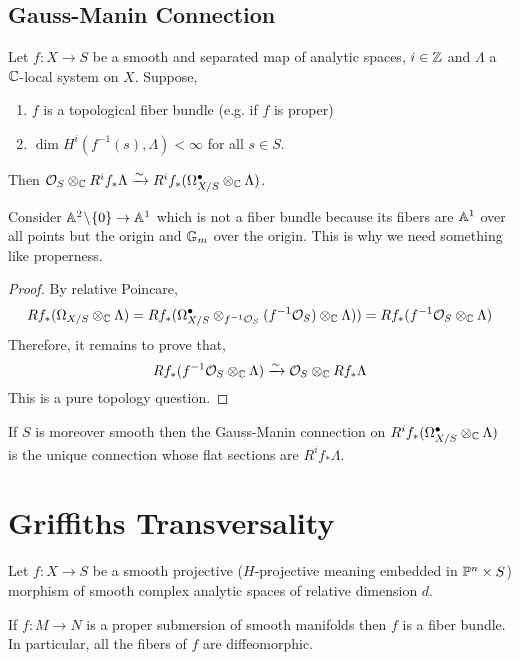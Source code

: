\documentclass[12pt]{article}
\begin{document}
\subsection{Gauss-Manin Connection}

\begin{prop}
Let $f : X \to S$ be a smooth and separated map of analytic spaces, $i \in \Z$ and $\Lambda$ a $\CC$-local system on $X$. Suppose,
\begin{enumerate}
\item $f$ is a topological fiber bundle (e.g. if $f$ is proper) 
\item $\dim{H^i(f^{-1}(s), \Lambda)} < \infty$ for all $s \in S$.
\end{enumerate}
Then $\struct{S} \ot_{\CC} R^i f_* \Lambda \iso R^i f_* (\Omega^\bullet_{X/S} \ot_{\CC} \Lambda)$.
\end{prop}

\begin{rmk}
Consider $\A^2 \sm \{ 0 \} \to \A^1$ which is not a fiber bundle because its fibers are $\A^1$ over all points but the origin and $\Gm$ over the origin. This is why we need something like properness.
\end{rmk}

\begin{proof}
By relative Poincare,
\[ R f_* (\Omega_{X/S} \ot_{\CC} \Lambda) =  R f_* (\Omega_{X/S}^\bullet \ot_{f^{-1} \struct{S}} (f^{-1} \struct{S}) \ot_{\CC} \Lambda)) = R f_* (f^{-1} \struct{S} \ot_{\CC} \Lambda) \]
Therefore, it remains to prove that,
\[ R f_* (f^{-1} \struct{S} \ot_{\CC} \Lambda) \iso \struct{S} \ot_{\CC} R f_* \Lambda \]
This is a pure topology question. 
\end{proof}

\begin{defn}
If $S$ is moreover smooth then the Gauss-Manin connection on $R^i f_* (\Omega_{X/S}^\bullet \ot_{\CC} \Lambda)$ is the unique connection whose flat sections are $R^i f_* \Lambda$. 
\end{defn}

\section{Griffiths Transversality}

Let $f : X \to S$ be a smooth projective ($H$-projective meaning embedded in $\P^n \times S$) morphism of smooth complex analytic spaces of relative dimension $d$. 

\begin{thm}[Ehresmann]
If $f : M \to N$ is a proper submersion of smooth manifolds then $f$ is a fiber bundle. In particular, all the fibers of $f$ are diffeomorphic. 
\end{thm}
\end{document}
